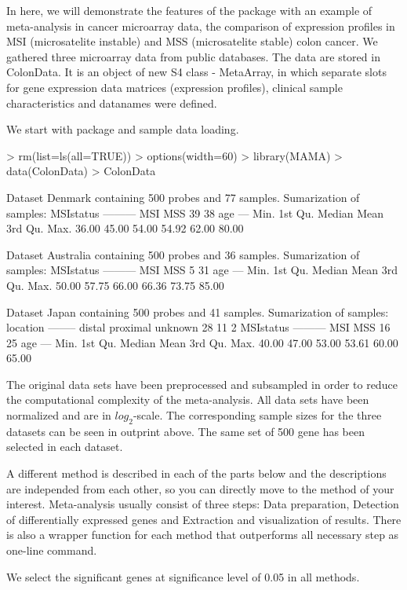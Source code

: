 \documentclass[a4paper]{report}
\begin{document}
In here, we will demonstrate the features of the package with an example of meta-analysis in cancer microarray data, the comparison of expression profiles in MSI (microsatelite instable) and MSS (microsatelite stable) colon cancer. We gathered three microarray data from public databases. The data are stored in {\ttfamily ColonData}. It is an object of new S4 class - {\ttfamily MetaArray}, in which separate slots for gene expression data matrices (expression profiles), clinical sample characteristics and datanames were defined. \par
We start with package and sample data loading. 
\begin{Schunk}
\begin{Sinput}
> rm(list=ls(all=TRUE))
> options(width=60)
> library(MAMA)
> data(ColonData)
> ColonData
\end{Sinput}
\begin{Soutput}
Dataset Denmark  containing 500 probes and  77 samples. 
Sumarization of samples: 
MSIstatus 
--------- 
MSI MSS 
 39  38 
age 
--- 
   Min. 1st Qu.  Median    Mean 3rd Qu.    Max. 
  36.00   45.00   54.00   54.92   62.00   80.00 

Dataset Australia  containing 500 probes and  36 samples. 
Sumarization of samples: 
MSIstatus 
--------- 
MSI MSS 
  5  31 
age 
--- 
   Min. 1st Qu.  Median    Mean 3rd Qu.    Max. 
  50.00   57.75   66.00   66.36   73.75   85.00 

Dataset Japan  containing 500 probes and  41 samples. 
Sumarization of samples: 
location 
-------- 
  distal proximal  unknown 
      28       11        2 
MSIstatus 
--------- 
MSI MSS 
 16  25 
age 
--- 
   Min. 1st Qu.  Median    Mean 3rd Qu.    Max. 
  40.00   47.00   53.00   53.61   60.00   65.00 
\end{Soutput}
\end{Schunk}
The original data sets have been preprocessed and subsampled in order to reduce the computational complexity of the meta-analysis. All data sets have been normalized and are in $log_2$-scale. The corresponding sample sizes for the three datasets can be seen in outprint above. The same set of 500 gene has been selected in each dataset.\par 
A different method is described in each of the parts below and the descriptions are independed from each other, so you can directly move to the method of your interest. Meta-analysis usually consist of three steps: Data preparation, Detection of differentially expressed genes and Extraction and visualization of results. There is also a wrapper function for each method that outperforms all necessary step as one-line command.\par
We select the significant genes at significance level of 0.05 in all methods. 
 
\end{document}

